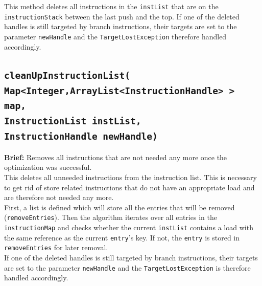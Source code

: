 This method deletes all instructions in the \texttt{instList} that are on the \texttt{instructionStack} between the last push and the top. If one of the deleted handles is still targeted by branch instructions, their targets are set to the parameter \texttt{newHandle} and the \texttt{TargetLostException} therefore handled accordingly.
\subsection{\texttt{cleanUpInstructionList(\\
\hspace{2cm}Map<Integer,ArrayList<InstructionHandle> > map,\\
\hspace{2cm}InstructionList instList,\\
\hspace{2cm}InstructionHandle newHandle)}}
\label{subsec:cleanup}
\textbf{Brief: }Removes all instructions that are not needed any more once the optimization was successful. \\

This deletes all unneeded instructions from the instruction list. This is necessary to get rid of store related instructions that do not have an appropriate load and are therefore not needed any more. \\
First, a list is defined which will store all the entries that will be removed (\texttt{removeEntries}). Then the algorithm iterates over all entries in the \texttt{instructionMap} and checks whether the current \texttt{instList} contains a load with the same reference as the current \texttt{entry}’s key. If not, the \texttt{entry} is stored in \texttt{removeEntries} for later removal.\\
If one of the deleted handles is still targeted by branch instructions, their targets are set to the parameter \texttt{newHandle} and the \texttt{TargetLostException} is therefore handled accordingly.